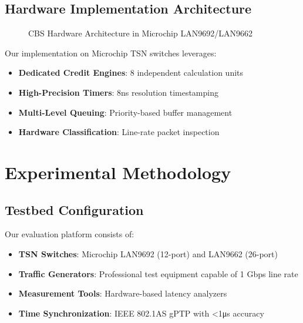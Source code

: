\documentclass[10pt, journal, compsoc]{IEEEtran}
\begin{document}
\subsection{Hardware Implementation Architecture}

\begin{figure}[H]
\centering
{}
\caption{CBS Hardware Architecture in Microchip LAN9692/LAN9662}
\label{fig:cbs_hw_arch}
\end{figure}

Our implementation on Microchip TSN switches leverages:

\begin{itemize}
    \item \textbf{Dedicated Credit Engines}: 8 independent calculation units
    \item \textbf{High-Precision Timers}: 8ns resolution timestamping
    \item \textbf{Multi-Level Queuing}: Priority-based buffer management
    \item \textbf{Hardware Classification}: Line-rate packet inspection
\end{itemize}

\section{Experimental Methodology}

\subsection{Testbed Configuration}

Our evaluation platform consists of:

\begin{itemize}
    \item \textbf{TSN Switches}: Microchip LAN9692 (12-port) and LAN9662 (26-port)
    \item \textbf{Traffic Generators}: Professional test equipment capable of 1 Gbps line rate
    \item \textbf{Measurement Tools}: Hardware-based latency analyzers
    \item \textbf{Time Synchronization}: IEEE 802.1AS gPTP with <1μs accuracy
\end{itemize}
\end{document}
